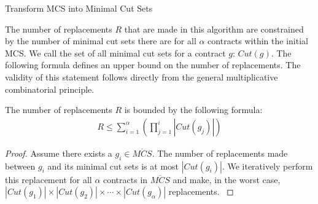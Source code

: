 \begin{algorithm}[h]
\DontPrintSemicolon
{}


\setcounter{AlgoLine}{0}


	\caption{Transform MCS into Minimal Cut Sets}
	\label{alg:transform_alg}
\end{algorithm}

The number of replacements $R$ that are made in this algorithm are constrained by the number of minimal cut sets there are for all $\alpha$ contracts within the initial MCS. We call the set of all minimal cut sets for a contract $g$: $\mathit{Cut(g)}$. The following formula defines an upper bound on the number of replacements. The validity of this statement follows directly from the general multiplicative combinatorial principle. 

\begin{lemma}
The number of replacements $R$ is bounded by the following formula:
\begin{gather}
\label{eq:bound}
  R \leq {\displaystyle \sum_{i=1}^{\alpha} }({\displaystyle \prod_{j=1}^{i} |\mathit{Cut(g_j)}|})  
\end{gather}
\begin{proof}
Assume there exists a $g_i \in \mathit{\overline{MCS}}$. The number of replacements made between $g_i$ and its minimal cut sets is at most $|\mathit{Cut(g_i)}|$. We iteratively perform this replacement for all $\alpha$ contracts in $\mathit{\overline{MCS}}$ and make, in the worst case, $|\mathit{Cut(g_1)}| \times |\mathit{Cut(g_2)}| \times \cdots \times |\mathit{Cut(g_\alpha)}|$ replacements.
\label{lemma:bound}
\end{proof}
\end{lemma}

